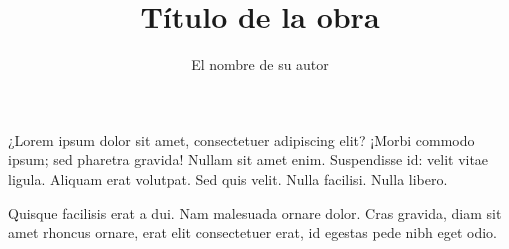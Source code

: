 \documentclass[12pt,a4paper]{book}
\begin{document}
\title{Título de la obra}
\author{El nombre de su autor}

\maketitle

¿Lorem ipsum dolor sit amet, consectetuer adipiscing elit?
¡Morbi commodo ipsum; sed pharetra gravida!
Nullam sit amet enim. Suspendisse id: velit vitae ligula.
Aliquam erat volutpat.
Sed quis velit. Nulla facilisi. Nulla libero. 

Quisque facilisis erat a dui.
Nam malesuada ornare dolor.
Cras gravida, diam sit amet rhoncus ornare, 
erat   elit consectetuer erat, id egestas pede nibh eget odio.
\end{document}
